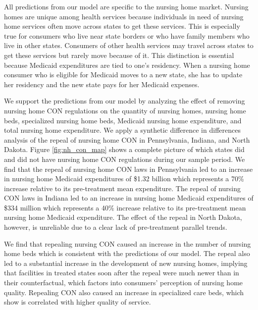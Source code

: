 \documentclass[../Main.tex]{subfiles}
\begin{document}
All predictions from our model are specific to the nursing home market. Nursing homes are unique among health services because individuals in need of nursing home services often move across states to get these services. This is especially true for consumers who live near state borders or who have family members who live in other states. Consumers of other health services may travel across states to get these services but rarely move because of it. This distinction is essential because Medicaid expenditures are tied to one's residency. When a nursing home consumer who is eligible for Medicaid moves to a new state, she has to update her residency and the new state pays for her Medicaid expenses.  

We support the predictions from our model by analyzing the effect of removing nursing home CON regulations on the quantity of nursing homes, nursing home beds, specialized nursing home beds, Medicaid nursing home expenditure, and total nursing home expenditure. We apply a synthetic difference in differences analysis of the repeal of nursing home CON in Pennsylvania, Indiana, and North Dakota. Figure \ref{fig:nh_con_map} shows a complete picture of which states did and did not have nursing home CON regulations during our sample period. We find that the repeal of nursing home CON laws in Pennsylvania led to an increase in nursing home Medicaid expenditures of \$1.32 billion which represents a 70\% increase relative to its pre-treatment mean expenditure. The repeal of nursing CON laws in Indiana led to an increase in nursing home Medicaid expenditures of \$334 million which represents a 40\% increase relative to its pre-treatment mean nursing home Medicaid expenditure. The effect of the repeal in North Dakota, however, is unreliable due to a clear lack of pre-treatment parallel trends. 

We find that repealing nursing CON caused an increase in the number of nursing home beds which is consistent with the predictions of our model. The repeal also led to a substantial increase in the development of new nursing homes, implying that facilities in treated states soon after the repeal were much newer than in their counterfactual, which factors into consumers' perception of nursing home quality. Repealing CON also caused an increase in specialized care beds, which \citet{grabowski2010quality} show is correlated with higher quality of service. 
\end{document}
